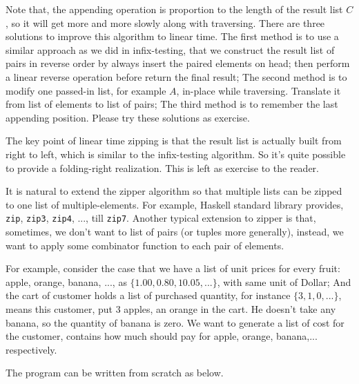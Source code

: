 \documentclass[UTF8]{article}
\begin{document}

Note that, the appending operation is proportion to the length of the result list $C$, so it will get
more and more slowly along with traversing. There are three solutions to improve this algorithm to
linear time. The first method is to use a similar approach as we did in infix-testing, that we construct
the result list of pairs in reverse order by always insert the paired elements on head; then perform
a linear reverse operation before return the final result; The second method is to modify one passed-in
list, for example $A$, in-place while traversing. Translate it from list of elements to list of pairs;
The third method is to remember the last appending position. Please try these solutions as exercise.

The key point of linear time zipping is that the result list is actually built from right to left, which
is similar to the infix-testing algorithm. So it's quite possible to provide a folding-right realization.
This is left as exercise to the reader.

It is natural to extend the zipper algorithm so that multiple lists can be zipped to one list of multiple-elements.
For example, Haskell standard library provides, \verb|zip|, \verb|zip3|, \verb|zip4|, ..., till \verb|zip7|.
Another typical extension to zipper is that, sometimes, we don't want to list of pairs (or tuples
more generally), instead, we want to apply some combinator function to each pair of elements.

For example, consider the case that we have a list of unit prices for every fruit: apple, orange, banana, ...,
 as $\{1.00, 0.80, 10.05, ...\}$, with same unit of Dollar; And the cart of customer holds a list
of purchased quantity, for instance $\{3, 1, 0, ...\}$, means this customer, put 3 apples, an orange in the
cart. He doesn't take any banana, so the quantity of banana is zero. We want to generate a list of cost for the
customer, contains how much should pay for apple, orange, banana,... respectively.

The program can be written from scratch as below.
\end{document}
